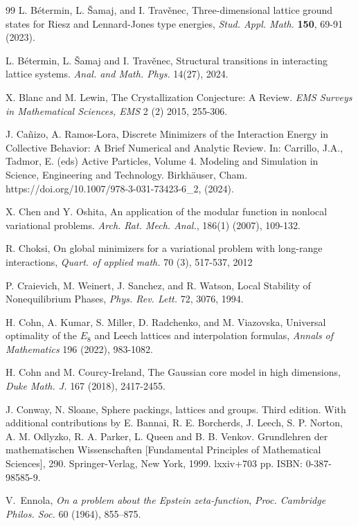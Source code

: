 \documentclass[reqno,english]{amsart}
\theoremstyle{definition}
\newtheorem{open problem}[theorem]{Open Problem}
\theoremstyle{remark}
\theoremstyle{plain}
\numberwithin{equation}{section}
\begin{document}
\begin{thebibliography}{99}
L. B\'{e}termin, L. \v{S}amaj, and I. Trav\v{e}nec,
Three-dimensional lattice ground states for Riesz and Lennard-Jones type energies,
\textit{Stud. Appl. Math.} \textbf{150}, 69-91 (2023).

L. B\'etermin, L. \v{S}amaj and I. Trav\v{e}nec, Structural transitions in interacting lattice systems. {\em Anal. and Math. Phys.} 14(27), 2024.

X. Blanc and M. Lewin, The Crystallization Conjecture: A Review. {\em EMS Surveys in Mathematical Sciences, EMS}  2 (2) 2015, 255-306.


J. Ca\~{n}izo, A. Ramos-Lora, Discrete Minimizers of the Interaction Energy in Collective Behavior: A Brief Numerical and Analytic Review. In: Carrillo, J.A., Tadmor, E. (eds) Active Particles, Volume 4. Modeling and Simulation in Science, Engineering and Technology. Birkh\"{a}user, Cham. https://doi.org/10.1007/978-3-031-73423-6\_2, (2024).


X. Chen and Y. Oshita, An application of the modular function in nonlocal variational problems. {\em Arch.
Rat. Mech. Anal.}, 186(1) (2007), 109-132.


R. Choksi,
On global minimizers for a variational problem with long-range interactions,
{\em Quart. of applied math.} 70 (3), 517-537, 2012


P. Craievich, M. Weinert, J. Sanchez, and R. Watson,
Local Stability of Nonequilibrium Phases, {\em Phys. Rev. Lett.} 72, 3076, 1994.


H. Cohn, A. Kumar, S. Miller, D. Radchenko, and M. Viazovska,
{Universal optimality of the $E_8$ and Leech lattices and interpolation formulas},
{\em Annals of Mathematics} {196} (2022), 983-1082.


H. Cohn and M. Courcy-Ireland,
{The Gaussian core model in high dimensions},
{\em Duke Math. J.} {167} (2018), 2417-2455.


J. Conway, N. Sloane, Sphere packings, lattices and groups. Third edition. With additional contributions by E. Bannai, R. E. Borcherds, J. Leech, S. P. Norton, A. M. Odlyzko, R. A. Parker, L. Queen and B. B. Venkov. Grundlehren der mathematischen Wissenschaften [Fundamental Principles of Mathematical Sciences], 290. Springer-Verlag, New York, 1999. lxxiv+703 pp. ISBN: 0-387-98585-9.

V.~Ennola, \emph{On a problem about the Epstein zeta-function},
{\em Proc. Cambridge Philos. Soc.} {60} (1964), 855--875.



\end{thebibliography}
\end{document}
